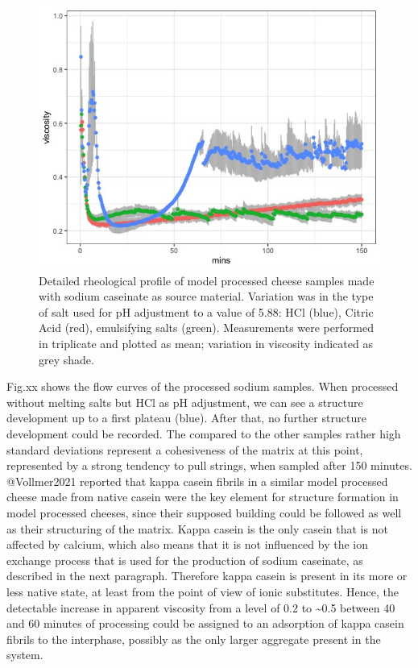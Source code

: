 \documentclass[
]{article}
\begin{document}
\begin{figure}
\includegraphics[width=0.75\linewidth]{plots/1.6_sodium.detail} \caption[measured apparent viscosity of models with sodium caseinate]{Detailed rheological profile of model processed cheese samples made with sodium caseinate as source material.  Variation was in the type of salt used for pH adjustment to a value of 5.88:  HCl (blue), Citric Acid (red), emulsifying salts (green).  Measurements were performed in triplicate and plotted as mean; variation in viscosity indicated as grey shade.}\label{fig:unnamed-chunk-9}
\end{figure}

Fig.xx shows the flow curves of the processed sodium samples. When
processed without melting salts but HCl as pH adjustment, we can see a
structure development up to a first plateau (blue). After that, no
further structure development could be recorded. The compared to the
other samples rather high standard deviations represent a cohesiveness
of the matrix at this point, represented by a strong tendency to pull
strings, when sampled after 150 minutes. @Vollmer2021 reported that
kappa casein fibrils in a similar model processed cheese made from
native casein were the key element for structure formation in model
processed cheeses, since their supposed building could be followed as
well as their structuring of the matrix. Kappa casein is the only casein
that is not affected by calcium, which also means that it is not
influenced by the ion exchange process that is used for the production
of sodium caseinate, as described in the next paragraph. Therefore kappa
casein is present in its more or less native state, at least from the
point of view of ionic substitutes. Hence, the detectable increase in
apparent viscosity from a level of 0.2 to \textasciitilde0.5 between 40
and 60 minutes of processing could be assigned to an adsorption of kappa
casein fibrils to the interphase, possibly as the only larger aggregate
present in the system.
\end{document}
